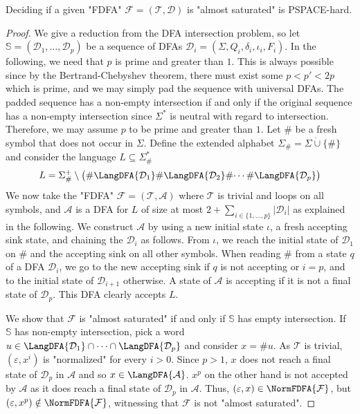 \documentclass[a4paper,USenglish,cleveref,autoref,thm-restate]{lipics-v2021}
\newcommand{\mc}[1]{\ensuremath{\mathcal{#1}}}
\newcommand{\A}{\mc{A}}
\newcommand{\T}{\mc{T}}
\newcommand{\F}{\mc{F}}
\newcommand{\D}{\mc{D}}
\newcommand{\eps}{\ensuremath{\varepsilon}}
\newcommand{\PSPACE}{\textsf{PSPACE}\xspace}
\begin{document}
{\begin{lemma}
    Deciding if a given "FDFA" $\F = (\T, \D)$ is "almost saturated" is \PSPACE-hard.
    \label{lemma:powerclosednessPSPACEhard}
\end{lemma}
\begin{proof}
  We give a reduction from the DFA intersection problem, so let $\mathbb{S} = (\D_1,\dotsc,\D_p)$ be a sequence of DFAs $\D_i = (\Sigma, Q_i, \delta_i, \iota_i, F_i)$.
  In the following, we need that $p$ is prime and greater than $1$.
  This is always possible since by the Bertrand-Chebyshev theorem, there must exist some $p < p' < 2p$ which is prime, and we may simply pad the sequence with universal DFAs.
  The padded sequence has a non-empty intersection if and only if the original sequence has a non-empty intersection since $\Sigma^*$ is neutral with regard to intersection.
  Therefore, we may assume $p$ to be prime and greater than $1$.
Let $\#$ be a fresh symbol that does not occur in $\Sigma$.
  Define the extended alphabet $\Sigma_\# = \Sigma \mathbin{\dot\cup} \{\#\}$ and consider the language $L \subseteq \Sigma_\#^*$ 
  \begin{align*}
    L = \Sigma_\#^+ \setminus \big(\# \LangDFA{\D_1} \# \LangDFA{\D_2} \# \dotsi \# \LangDFA{\D_p}\big)
  \end{align*}
  We now take the "FDFA" $\F = (\T, \A)$ where $\T$ is trivial and loops on all symbols, and $\A$ is a DFA for $L$ of size at most $2 + \sum_{i \in \{1,\dots,p\}} |\D_i|$ as explained in the following.
  We construct $\A$ by using a new initial state $\iota$, a fresh accepting sink state, and chaining the $\D_i$ as follows.
  From $\iota$, we reach the initial state of $\D_1$ on $\#$ and the accepting sink on all other symbols.
  When reading $\#$ from a state $q$ of a DFA $\D_i$, we go to the new accepting sink if $q$ is not accepting or $i=p$, and to the initial state of $\D_{i+1}$ otherwise.
  A state of $\A$ is accepting if it is not a final state of $\D_p$. This DFA clearly accepts $L$.

 We show that $\F$ is "almost saturated" if and only if $\mathbb{S}$ has empty intersection.
 If $\mathbb{S}$ has non-empty intersection, pick a word $u \in \LangDFA{\D_1}\cap \dots \cap \LangDFA{\D_p}$ and consider $x = \#u$.
 As $\T$ is trivial, $(\eps, x^i)$ is "normalized" for every $i > 0$.
 Since $p > 1$, $x$ does not reach a final state of $\D_p$ in $\A$ and so $x \in \LangDFA{\A}$.
 $x^p$ on the other hand is not accepted by $\A$ as it does reach a final state of $\D_p$ in $\A$.
 Thus, $(\eps,x) \in \NormFDFA{\F}$, but $(\eps, x^p) \notin \NormFDFA{\F}$, witnessing that $\F$ is not "almost saturated".


\end{proof}}
\end{document}
